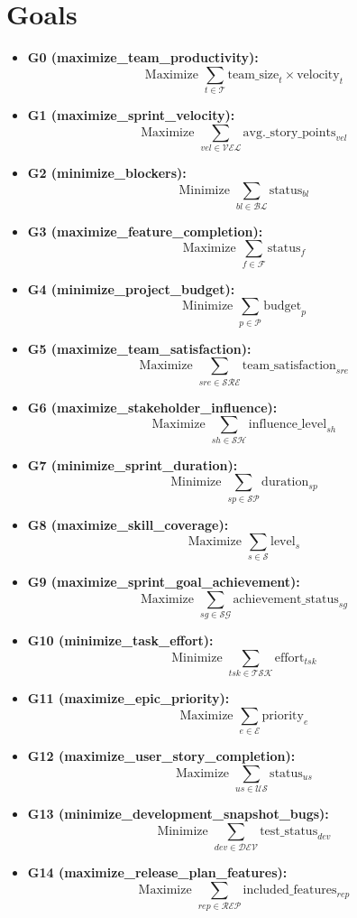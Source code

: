 \documentclass{article}
\begin{document}
\section{Goals}
\begin{itemize}
    \item \textbf{G0 (maximize\_team\_productivity):}
    \[
    \text{Maximize } \sum_{t \in \mathcal{T}} \text{team\_size}_t \times \text{velocity}_t
    \]
    \item \textbf{G1 (maximize\_sprint\_velocity):}
    \[
    \text{Maximize } \sum_{vel \in \mathcal{VEL}} \text{avg.\_story\_points}_{vel}
    \]
    \item \textbf{G2 (minimize\_blockers):}
    \[
    \text{Minimize } \sum_{bl \in \mathcal{BL}} \text{status}_{bl}
    \]
    \item \textbf{G3 (maximize\_feature\_completion):}
    \[
    \text{Maximize } \sum_{f \in \mathcal{F}} \text{status}_f
    \]
    \item \textbf{G4 (minimize\_project\_budget):}
    \[
    \text{Minimize } \sum_{p \in \mathcal{P}} \text{budget}_p
    \]
    \item \textbf{G5 (maximize\_team\_satisfaction):}
    \[
    \text{Maximize } \sum_{sre \in \mathcal{SRE}} \text{team\_satisfaction}_{sre}
    \]
    \item \textbf{G6 (maximize\_stakeholder\_influence):}
    \[
    \text{Maximize } \sum_{sh \in \mathcal{SH}} \text{influence\_level}_{sh}
    \]
    \item \textbf{G7 (minimize\_sprint\_duration):}
    \[
    \text{Minimize } \sum_{sp \in \mathcal{SP}} \text{duration}_{sp}
    \]
    \item \textbf{G8 (maximize\_skill\_coverage):}
    \[
    \text{Maximize } \sum_{s \in \mathcal{S}} \text{level}_s
    \]
    \item \textbf{G9 (maximize\_sprint\_goal\_achievement):}
    \[
    \text{Maximize } \sum_{sg \in \mathcal{SG}} \text{achievement\_status}_{sg}
    \]
    \item \textbf{G10 (minimize\_task\_effort):}
    \[
    \text{Minimize } \sum_{tsk \in \mathcal{TSK}} \text{effort}_{tsk}
    \]
    \item \textbf{G11 (maximize\_epic\_priority):}
    \[
    \text{Maximize } \sum_{e \in \mathcal{E}} \text{priority}_e
    \]
    \item \textbf{G12 (maximize\_user\_story\_completion):}
    \[
    \text{Maximize } \sum_{us \in \mathcal{US}} \text{status}_{us}
    \]
    \item \textbf{G13 (minimize\_development\_snapshot\_bugs):}
    \[
    \text{Minimize } \sum_{dev \in \mathcal{DEV}} \text{test\_status}_{dev}
    \]
    \item \textbf{G14 (maximize\_release\_plan\_features):}
    \[
    \text{Maximize } \sum_{rep \in \mathcal{REP}} \text{included\_features}_{rep}
    \]
\end{itemize}
\end{document}

